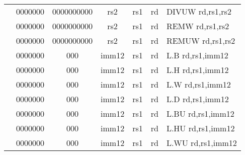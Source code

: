 \begin{table}[p]
\begin{small}
\begin{center}
\begin{tabular}{rcccccccccl}
&
\multicolumn{1}{|c|}{0000000} &
\multicolumn{5}{c|}{0000000000} &
\multicolumn{1}{c|}{rs2} &
\multicolumn{1}{c|}{rs1} &
\multicolumn{1}{c|}{rd} & DIVUW rd,rs1,rs2 \\
\cline{2-10}
  

&
\multicolumn{1}{|c|}{0000000} &
\multicolumn{5}{c|}{0000000000} &
\multicolumn{1}{c|}{rs2} &
\multicolumn{1}{c|}{rs1} &
\multicolumn{1}{c|}{rd} & REMW rd,rs1,rs2 \\
\cline{2-10}
  

&
\multicolumn{1}{|c|}{0000000} &
\multicolumn{5}{c|}{0000000000} &
\multicolumn{1}{c|}{rs2} &
\multicolumn{1}{c|}{rs1} &
\multicolumn{1}{c|}{rd} & REMUW rd,rs1,rs2 \\
\cline{2-10}
  

&
\multicolumn{1}{|c|}{0000000} &
\multicolumn{2}{c|}{000} &
\multicolumn{4}{c|}{imm12} &
\multicolumn{1}{c|}{rs1} &
\multicolumn{1}{c|}{rd} & L.B rd,rs1,imm12 \\
\cline{2-10}
  

&
\multicolumn{1}{|c|}{0000000} &
\multicolumn{2}{c|}{000} &
\multicolumn{4}{c|}{imm12} &
\multicolumn{1}{c|}{rs1} &
\multicolumn{1}{c|}{rd} & L.H rd,rs1,imm12 \\
\cline{2-10}
  

&
\multicolumn{1}{|c|}{0000000} &
\multicolumn{2}{c|}{000} &
\multicolumn{4}{c|}{imm12} &
\multicolumn{1}{c|}{rs1} &
\multicolumn{1}{c|}{rd} & L.W rd,rs1,imm12 \\
\cline{2-10}
  

&
\multicolumn{1}{|c|}{0000000} &
\multicolumn{2}{c|}{000} &
\multicolumn{4}{c|}{imm12} &
\multicolumn{1}{c|}{rs1} &
\multicolumn{1}{c|}{rd} & L.D rd,rs1,imm12 \\
\cline{2-10}
  

&
\multicolumn{1}{|c|}{0000000} &
\multicolumn{2}{c|}{000} &
\multicolumn{4}{c|}{imm12} &
\multicolumn{1}{c|}{rs1} &
\multicolumn{1}{c|}{rd} & L.BU rd,rs1,imm12 \\
\cline{2-10}
  

&
\multicolumn{1}{|c|}{0000000} &
\multicolumn{2}{c|}{000} &
\multicolumn{4}{c|}{imm12} &
\multicolumn{1}{c|}{rs1} &
\multicolumn{1}{c|}{rd} & L.HU rd,rs1,imm12 \\
\cline{2-10}
  

&
\multicolumn{1}{|c|}{0000000} &
\multicolumn{2}{c|}{000} &
\multicolumn{4}{c|}{imm12} &
\multicolumn{1}{c|}{rs1} &
\multicolumn{1}{c|}{rd} & L.WU rd,rs1,imm12 \\
\cline{2-10}
  


\end{tabular}
\end{center}
\end{small}
\end{table}

